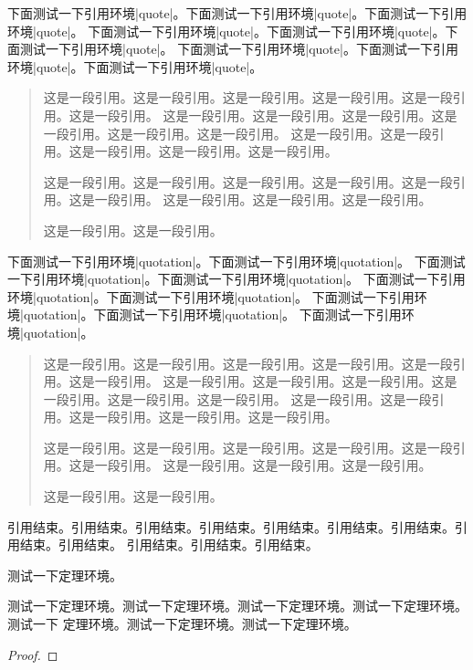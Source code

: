 下面测试一下引用环境|quote|。下面测试一下引用环境|quote|。下面测试一下引用环境|quote|。
下面测试一下引用环境|quote|。下面测试一下引用环境|quote|。下面测试一下引用环境|quote|。
下面测试一下引用环境|quote|。下面测试一下引用环境|quote|。下面测试一下引用环境|quote|。

\begin{quote}
    这是一段引用。这是一段引用。这是一段引用。这是一段引用。这是一段引用。这是一段引用。
    这是一段引用。这是一段引用。这是一段引用。这是一段引用。这是一段引用。这是一段引用。
    这是一段引用。这是一段引用。这是一段引用。这是一段引用。这是一段引用。
    
    这是一段引用。这是一段引用。这是一段引用。这是一段引用。这是一段引用。这是一段引用。
    这是一段引用。这是一段引用。这是一段引用。
    
    这是一段引用。这是一段引用。
\end{quote}

下面测试一下引用环境|quotation|。下面测试一下引用环境|quotation|。
下面测试一下引用环境|quotation|。下面测试一下引用环境|quotation|。
下面测试一下引用环境|quotation|。下面测试一下引用环境|quotation|。
下面测试一下引用环境|quotation|。下面测试一下引用环境|quotation|。
下面测试一下引用环境|quotation|。

\begin{quotation}
    这是一段引用。这是一段引用。这是一段引用。这是一段引用。这是一段引用。这是一段引用。
    这是一段引用。这是一段引用。这是一段引用。这是一段引用。这是一段引用。这是一段引用。
    这是一段引用。这是一段引用。这是一段引用。这是一段引用。这是一段引用。
    
    这是一段引用。这是一段引用。这是一段引用。这是一段引用。这是一段引用。这是一段引用。
    这是一段引用。这是一段引用。这是一段引用。
    
    这是一段引用。这是一段引用。
\end{quotation}

引用结束。引用结束。引用结束。引用结束。引用结束。引用结束。引用结束。引用结束。引用结束。
引用结束。引用结束。引用结束。

测试一下定理环境。

\begin{theorem}[测试定理]
    测试一下定理环境。测试一下定理环境。测试一下定理环境。测试一下定理环境。测试一下
    定理环境。测试一下定理环境。测试一下定理环境。
\end{theorem}
\begin{proof}
    \blindtext
\end{proof}

